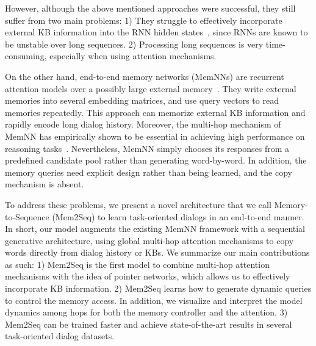 \documentclass[11pt,a4paper]{article}
\begin{document}
However, although the above mentioned approaches were successful, they still suffer from two main problems: 
1) They struggle to effectively incorporate external KB information into the RNN hidden states~\cite{sukhbaatar2015end}, since RNNs are known to be unstable over long sequences.
2) Processing long sequences is very time-consuming, especially when using attention mechanisms.

On the other hand, end-to-end memory networks (MemNNs) are recurrent attention models over a possibly large external memory~\cite{sukhbaatar2015end}. They write external memories into several embedding matrices, and use query vectors to read memories repeatedly. This approach can memorize external KB information and rapidly encode long dialog history. Moreover, the multi-hop mechanism of MemNN has empirically shown to be essential in achieving high performance on reasoning tasks~\cite{bordes2016learning}. Nevertheless, MemNN simply chooses its responses from a predefined candidate pool rather than generating word-by-word. In addition, the memory queries need explicit design rather than being learned, and the copy mechanism is absent.

To address these problems, we present a novel architecture that we call Memory-to-Sequence (Mem2Seq) to learn task-oriented dialogs in an end-to-end manner. In short, our model augments the existing MemNN framework with a sequential generative architecture, using global multi-hop attention mechanisms to copy words directly from dialog history or KBs. We summarize our main contributions as such: 
1) Mem2Seq is the first model to combine multi-hop attention mechanisms with the idea of pointer networks, which allows us to effectively incorporate KB information. 
2) Mem2Seq learns how to generate dynamic queries to control the memory access. In addition, we visualize and interpret the model dynamics among hops for both the memory controller and the attention.
3) Mem2Seq can be trained faster and achieve state-of-the-art results in several task-oriented dialog datasets.
\end{document}
